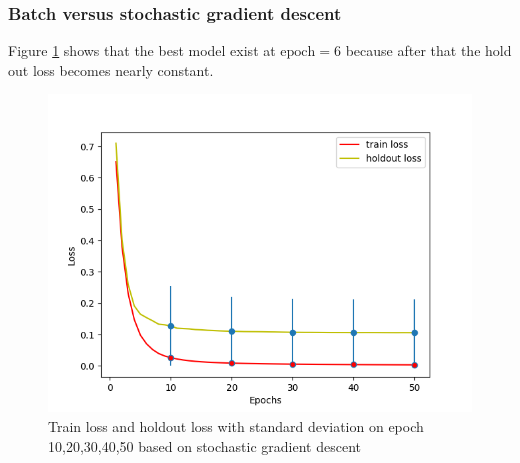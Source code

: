 \documentclass{article}
\begin{document}
\subsubsection{Batch versus stochastic gradient descent}
Figure \ref{figure: loss_sgd} shows that the best model exist at $\text{epoch}=6$ because after that the hold out loss becomes nearly constant.
\begin{figure}[ht]
\begin{center}
\includegraphics[scale=0.5]{images/softmax_sgd.png}
\end{center}
\caption{Train loss and holdout loss with standard deviation on epoch 10,20,30,40,50 based on stochastic gradient descent}
\label{figure: loss_sgd}
\end{figure}
\end{document}
